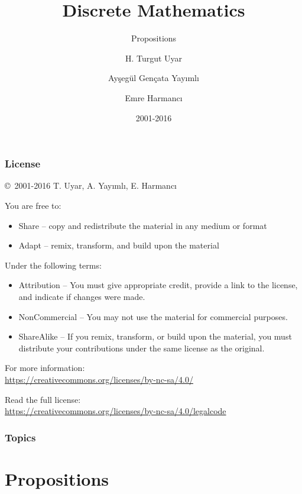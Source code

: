 \documentclass[dvipsnames]{beamer}
\title{Discrete Mathematics}
\subtitle{Propositions}
\author{H. Turgut Uyar \and Ayşegül Gençata Yayımlı \and Emre Harmancı}
\date{2001-2016}
\begin{document}
\begin{frame}
  \titlepage
\end{frame}

\begin{frame}
  \frametitle{License}

  \hfill
  \copyright~2001-2016 T. Uyar, A. Yayımlı, E. Harmancı

  \vfill
  \begin{footnotesize}
    You are free to:
    \begin{itemize}
      \itemsep0em
      \item Share -- copy and redistribute the material in any medium or format
      \item Adapt -- remix, transform, and build upon the material
    \end{itemize}

    Under the following terms:
    \begin{itemize}
      \itemsep0em
      \item Attribution -- You must give appropriate credit, provide a link to
        the license, and indicate if changes were made.

      \item NonCommercial -- You may not use the material for commercial
        purposes.

      \item ShareAlike -- If you remix, transform, or build upon the material,
        you must distribute your contributions under the same license as the
        original.
    \end{itemize}
  \end{footnotesize}

  \begin{small}
    For more information:\\
    \url{https://creativecommons.org/licenses/by-nc-sa/4.0/}

    \smallskip
    Read the full license:\\
    \url{https://creativecommons.org/licenses/by-nc-sa/4.0/legalcode}
  \end{small}
\end{frame}

\begin{frame}
  \frametitle{Topics}
  \tableofcontents
\end{frame}

\section{Propositions}
\end{document}
